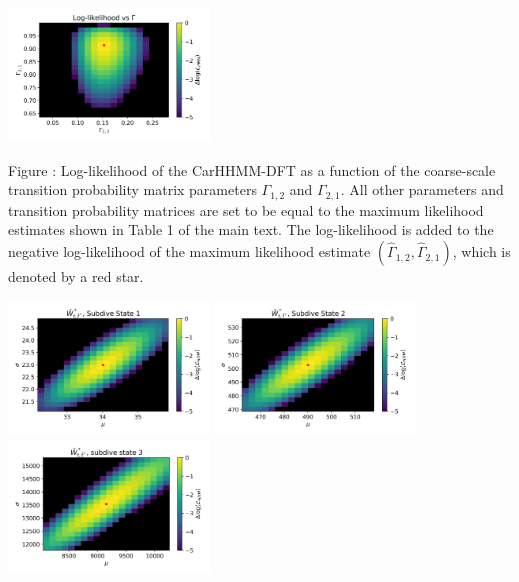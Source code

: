 \documentclass{article}
\begin{document}
        
        \begin{center}
        \includegraphics[width=2.1in]{../Plots/2019/20190902-182840-CATs_OB_1_0_267_CarHHMM2_coarse-gamma-likelihood.png}
        \end{center}
        
        \noindent Figure : Log-likelihood of the CarHHMM-DFT as a function of the coarse-scale transition probability matrix parameters $\Gamma_{1,2}$ and $\Gamma_{2,1}$. All other parameters and transition probability matrices are set to be equal to the maximum likelihood estimates shown in Table 1 of the main text. The log-likelihood is added to the negative log-likelihood of the maximum likelihood estimate $(\hat \Gamma_{1,2},\hat \Gamma_{2,1})$, which is denoted by a red star.
        \addtocounter{fignum}{1}
        
        \begin{center}
        \includegraphics[width=2.1in]{../Plots/2019/20190902-182840-CATs_OB_1_0_267_CarHHMM2_fine-theta-likelihood-Ahat_low-0.png}
        \includegraphics[width=2.1in]{../Plots/2019/20190902-182840-CATs_OB_1_0_267_CarHHMM2_fine-theta-likelihood-Ahat_low-1.png}
        \includegraphics[width=2.1in]{../Plots/2019/20190902-182840-CATs_OB_1_0_267_CarHHMM2_fine-theta-likelihood-Ahat_low-2.png}
        \end{center}
        
\end{document}
